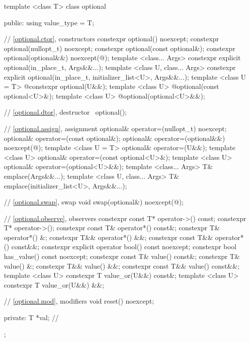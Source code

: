 %
\begin{codeblock}
template <class T>
  class optional {
  public:
    using value_type = T;

    // \ref{optional.ctor}, constructors
    constexpr optional() noexcept;
    constexpr optional(nullopt_t) noexcept;
    constexpr optional(const optional&);
    constexpr optional(optional&&) noexcept(@\seebelow@);
    template <class... Args>
      constexpr explicit optional(in_place_t, Args&&...);
    template <class U, class... Args>
      constexpr explicit optional(in_place_t, initializer_list<U>, Args&&...);
    template <class U = T>
      @\EXPLICIT@ constexpr optional(U&&);
    template <class U>
      @\EXPLICIT@ optional(const optional<U>&);
    template <class U>
      @\EXPLICIT@ optional(optional<U>&&);

    // \ref{optional.dtor}, destructor
    ~optional();

    // \ref{optional.assign}, assignment
    optional& operator=(nullopt_t) noexcept;
    optional& operator=(const optional&);
    optional& operator=(optional&&) noexcept(@\seebelow@);
    template <class U = T> optional& operator=(U&&);
    template <class U> optional& operator=(const optional<U>&);
    template <class U> optional& operator=(optional<U>&&);
    template <class... Args> T& emplace(Args&&...);
    template <class U, class... Args> T& emplace(initializer_list<U>, Args&&...);

    // \ref{optional.swap}, swap
    void swap(optional&) noexcept(@\seebelow@);

    // \ref{optional.observe}, observers
    constexpr const T* operator->() const;
    constexpr T* operator->();
    constexpr const T& operator*() const&;
    constexpr T& operator*() &;
    constexpr T&& operator*() &&;
    constexpr const T&& operator*() const&&;
    constexpr explicit operator bool() const noexcept;
    constexpr bool has_value() const noexcept;
    constexpr const T& value() const&;
    constexpr T& value() &;
    constexpr T&& value() &&;
    constexpr const T&& value() const&&;
    template <class U> constexpr T value_or(U&&) const&;
    template <class U> constexpr T value_or(U&&) &&;

    // \ref{optional.mod}, modifiers
    void reset() noexcept;

  private:
    T *val; // \expos
  };
\end{codeblock}

